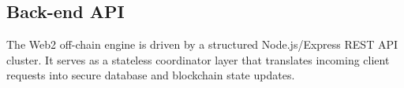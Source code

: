 \subsection{Back-end API}

    The Web2 off-chain engine is driven by a structured Node.js/Express REST API cluster. It serves as a stateless coordinator layer that translates incoming client requests into secure database and blockchain state updates.

    
